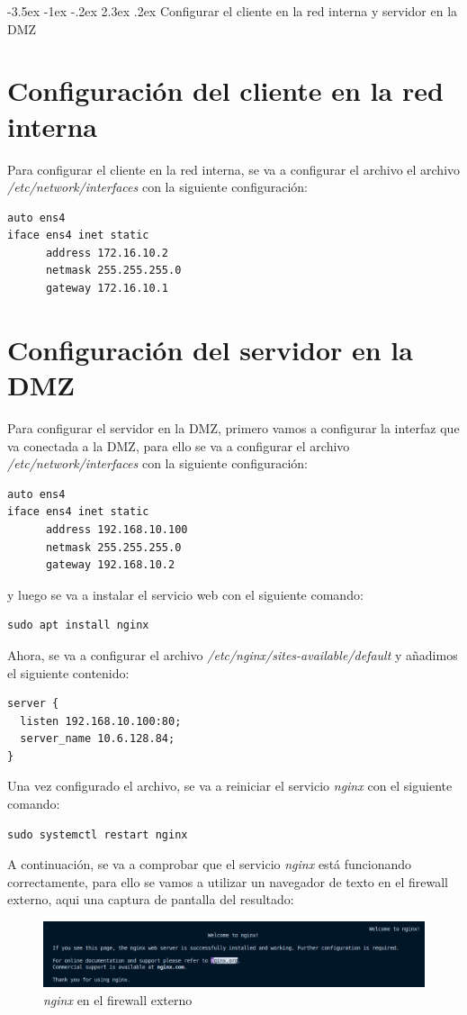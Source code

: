\documentclass[11pt]{report}
\makeatletter
\renewcommand\chapter{\@startsection{chapter}{0}{\z@}%
    {-3.5ex \@plus -1ex \@minus -.2ex}%
    {2.3ex \@plus.2ex}%
    {\normalfont\Large\bfseries}}
\makeatother
\begin{document}
\chapter{Configurar el cliente en la red interna y servidor en la DMZ}
\section{Configuración del cliente en la red interna}
Para configurar el cliente en la red interna, se va a configurar el archivo el archivo \emph{/etc/network/interfaces}
con la siguiente configuración:
\begin{verbatim}
auto ens4
iface ens4 inet static
      address 172.16.10.2
      netmask 255.255.255.0
      gateway 172.16.10.1
\end{verbatim}

\section{Configuración del servidor en la DMZ}
Para configurar el servidor en la DMZ, primero vamos a configurar la interfaz que va conectada a la DMZ, para ello se va a configurar el archivo \emph{/etc/network/interfaces}
con la siguiente configuración:
\begin{verbatim}
auto ens4
iface ens4 inet static
      address 192.168.10.100
      netmask 255.255.255.0
      gateway 192.168.10.2
\end{verbatim}

y luego se va a instalar el servicio web con el siguiente comando:
\begin{BVerbatim}
sudo apt install nginx
\end{BVerbatim}

Ahora, se va a configurar el archivo \emph{/etc/nginx/sites-available/default} y añadimos
el siguiente contenido:
\begin{verbatim}
server {
  listen 192.168.10.100:80;
  server_name 10.6.128.84;
}
\end{verbatim}

Una vez configurado el archivo, se va a reiniciar el servicio \emph{nginx} con el siguiente comando: \\
\begin{BVerbatim}
sudo systemctl restart nginx
\end{BVerbatim}

A continuación, se va a comprobar que el servicio \emph{nginx} está funcionando correctamente, para ello se vamos a utilizar un navegador de texto 
en el firewall externo, aqui una captura de pantalla del resultado:
\begin{figure}[H]
  \centering
  \includegraphics[scale=0.55]{img/nginx_fw_externo.png}
  \caption{\emph{nginx} en el firewall externo}
  \label{fig:nginx en el firewall externo}
\end{figure}
\end{document}
